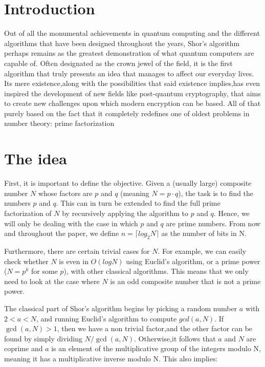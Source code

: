 \chapter{Introduction}

Out of all the monumental achievements in quantum computing and the different algorithms that have been designed throughout the years, Shor's algorithm perhaps remains as the greatest demonstration of what quantum computers are capable of. Often designated as the crown jewel of the field, it is the first algorithm that truly presents an idea that manages to affect our everyday lives. Its mere existence,along with the possibilities that said existence implies,has even inspired the development of new fields like post-quantum cryptography, that aims to create new challenges upon which modern encryption can be based. All of that purely based on the fact that it completely redefines one of oldest problems in number theory: prime factorization

\chapter{The idea}

First, it is important to define the objective. Given a (usually large) composite number $N$ whose factors are $p$ and $q$ (meaning $N = p\cdot q$), the task is to find the numbers $p$ and $q$. This can in turn be extended to find the full prime factorization of $N$ by recursively applying the algorithm to $p$ and $q$. Hence, we will only be dealing with the case in which $p$ and $q$ are prime numbers. From now and throughout the paper, we define $n = \lceil log_2 N \rceil$ as the number of bits in N.

Furthermore, there are certain trivial cases for $N$. For example, we can easily check whether $N$ is even in $O(logN)$ using Euclid's algorithm, or a prime power ($N = p^k$ for some $p$), with other classical algorithms. This means that we only need to look at the case where $N$ is an odd composite number that is not a prime power.

The classical part of Shor's algorithm begins by picking a random number $a$ with $2<a<N$, and running Euclid's algorithm to compute $gcd(a,N)$. If $\gcd(a,N) > 1$, then we have a non trivial factor,and the other factor can be found by simply dividing $N/\gcd(a,N)$. Otherwise,it follows that $a$ and $N$ are coprime and $a$ is an element of the multiplicative group of the integers modulo N, meaning it has a multiplicative inverse modulo N. This also implies:

